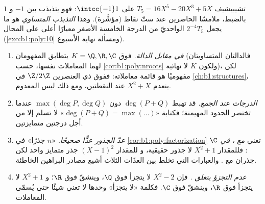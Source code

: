 \begin{omfigure}

{\small {} تشيبيشيف $T_5 = 16X^5 - 20X^3 + 5X$ على
$\intcc{-1}1$: فهو يتذبذب بين $-1$ و $1$ بالضبط،
ملامسًا الحاصرين عند ستّ نقاط (مؤشَّرة). وهذا
\emph{التذبذب المتساوي} هو ما يجعل $2^{-4}T_5$ 
الواحديّ من الدرجة الخامسة الأصغر معيارًا أعلى على المجال
(\cref{exo:b1:poly:10} ومسألة نهاية الأسبوع).}
\end{omfigure}

\begin{remark}\label{rem:b1:poly:pitfalls}
\begin{enumerate}
  \item \emph{ في مقابل الدالة.} فوق $K = \Q, \R, \C$
        يتطابق المفهومان (فالدالتان المتساويتان لهما المعاملات
        نفسها، حسب \cref{cor:b1:poly:nroots} ولكون $K$
        لا نهائية)، لكن  مفهوميًا هو
        قائمة معاملاته: ففوق  ذي العنصرين
        $\Z/2\Z$ في \cref{ch:b1:structures}، ينعدم $X^2 + X$
        عند النقطتين، ومع ذلك ليس  المعدوم.
  \item \emph{الدرجات عند الجمع.} قد تهبط $\deg(P + Q)$
        دون $\max(\deg P, \deg Q)$ عندما تختصر الحدود المهيمنة؛
        فكتابة «$\deg(P + Q) = \max(\dots)$» لا تسلم إلا من أجل
        درجتين متمايزتين.
  \item \emph{عدّ الجذور عدًّا صحيحًا.}  «$n$ جذرًا» في
        \cref{cor:b1:poly:factorization} تعني \emph{مع
        ، في $\C$}: فللمقدار $X^2 + 1$ لا جذور حقيقية، و
        للمقدار $(X-1)^2$ جذر متمايز واحد لكن جذران مع
        . والعبارات التي تخلط بين العدّات الثلاث أشيع
        مصادر البراهين الخاطئة.
  \item \emph{عدم التجزؤ يتعلق .} فإن $X^2 - 2$
        لا يتجزأ فوق $\Q$، وينشقّ فوق $\R$؛ و $X^2 + 1$
        لا يتجزأ فوق $\R$، وينشقّ فوق $\C$. فكلمة
        «لا يتجزأ» وحدها لا تعني شيئًا حتى يُسمّى 
        المعاملات.
\end{enumerate}
\end{remark}

